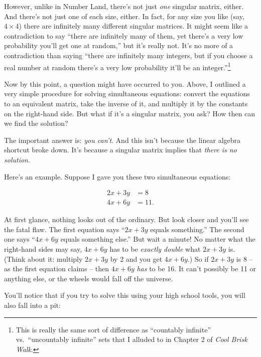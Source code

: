 However, unlike in Number Land, there's not just \textit{one} singular matrix,
either. And there's not just one of each size, either. In fact, for any size
you like (say, $4\times 4$) there are infinitely many different singular
matrices. It might seem like a contradiction to say ``there are infinitely many
of them, yet there's a very low probability you'll get one at random,'' but
it's really not. It's no more of a contradiction than saying ``there are
infinitely many integers, but if you choose a real number at random there's a
very low probability it'll be an integer.''\footnote{This is really the same
sort of difference as ``countably infinite'' vs.~``uncountably infinite'' sets
that I alluded to in Chapter 2 of \textit{Cool Brisk Walk}.}

Now by this point, a question might have occurred to you. Above, I outlined a
very simple procedure for solving simultaneous equations: convert the equations
to an equivalent matrix, take the inverse of it, and multiply it by the
constants on the right-hand side. But what if it's a singular matrix, you ask?
How then can we find the solution?

The important answer is: \textit{you can't}. And this isn't because the linear
algebra shortcut broke down. It's because a singular matrix implies that
\textit{there is no solution}.

Here's an example. Suppose I gave you these two simultaneous equations:

\vspace{-.25in}
\begin{align*}
2x + 3y &= 8 \\
4x + 6y &= 11.
\end{align*}
\vspace{-.25in}

At first glance, nothing looks out of the ordinary. But look closer and you'll
see the fatal flaw. The first equation says ``$2x+3y$ equals something.'' The
second one says ``$4x+6y$ equals something else.'' But wait a minute! No matter
what the right-hand sides may say, $4x+6y$ has to be \textit{exactly double}
what $2x+3y$ is. (Think about it: multiply $2x+3y$ by 2 and you get $4x+6y$.)
So if $2x+3y$ is 8 -- as the first equation claims -- then $4x+6y$ \textit{has}
to be 16. It can't possibly be 11 or anything else, or the wheels would fall
off the universe.

You'll notice that if you try to solve this using your high school tools, you
will also fall into a pit:

